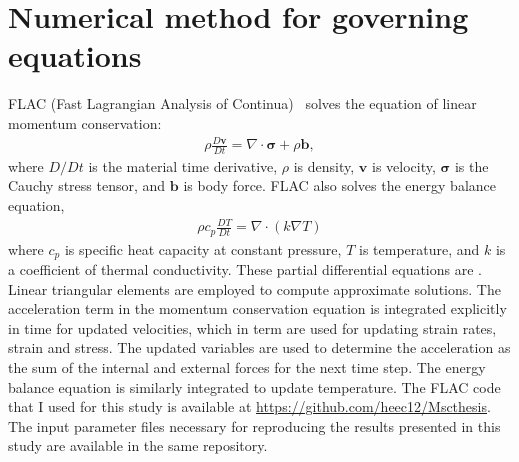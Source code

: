\documentclass[letterpaper,12pt,notitle]{memphisthesis}                     %
\begin{document}
%
%
%
%

\section{Numerical method for governing equations}
FLAC (Fast Lagrangian Analysis of Continua)~\citep{Cundall1982, Poliakov1993, Lavier2002} solves the equation of linear momentum conservation:
\begin{align}
\rho \frac{D \mathbf{v}}{Dt} = \nabla \cdot \boldsymbol{\sigma} + \rho \mathbf{b},
\end{align}
where $D/Dt$ is the material time derivative, $\rho$ is density, $\mathbf{v}$ is velocity, $\boldsymbol{\sigma}$ is the Cauchy stress tensor, and $\mathbf{b}$ is body force. %
FLAC also solves the energy balance equation,
\begin{align}
\rho c_{p} \frac{D T}{D t} = \nabla \cdot ( k \nabla T)
\end{align}
where $c_{p}$ is specific heat capacity at constant pressure, $T$ is temperature, and $k$ is a coefficient of thermal conductivity. 
%
These partial differential equations are  . Linear triangular elements are employed to compute approximate solutions. The acceleration term in the momentum conservation equation is integrated explicitly in time for updated velocities, which in term are used for updating strain rates, strain and stress. The updated variables are used to determine the acceleration as the sum of the internal and external forces for the next time step. The energy balance equation is similarly integrated to update temperature. The FLAC code that I used for this study is available at \url{https://github.com/heec12/Mscthesis}. The input parameter files necessary for reproducing the results presented in this study are available in the same repository.
\end{document}
